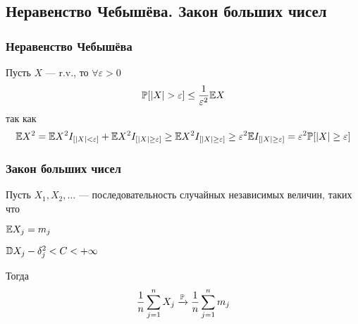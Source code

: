 \subsection{Неравенство Чебышёва. Закон больших
чисел}\label{ux43dux435ux440ux430ux432ux435ux43dux441ux442ux432ux43e-ux447ux435ux431ux44bux448ux451ux432ux430.-ux437ux430ux43aux43eux43d-ux431ux43eux43bux44cux448ux438ux445-ux447ux438ux441ux435ux43b}

\subsubsection{Неравенство
Чебышёва}\label{ux43dux435ux440ux430ux432ux435ux43dux441ux442ux432ux43e-ux447ux435ux431ux44bux448ux451ux432ux430}

Пусть \(X\) --- r.v., то \(\forall \varepsilon > 0\)
\[ \mathbb P [ |X| > \varepsilon ] \leq \frac{1}{\varepsilon^2} \mathbb E X \] так
как
\[ \mathbb E X^2 = \mathbb E X^2 I_{[|X|<\varepsilon]} + \mathbb E X^2 I_{[|X| \geq \varepsilon]} \geq 
   \mathbb E X^2 I_{[|X| \geq \varepsilon]} \geq
   \varepsilon^2 \mathbb E I_{[|X|\geq\varepsilon]} = \varepsilon^2 \mathbb P [|X|\geq\varepsilon] \]

\subsubsection{Закон больших
чисел}\label{ux437ux430ux43aux43eux43d-ux431ux43eux43bux44cux448ux438ux445-ux447ux438ux441ux435ux43b}

Пусть \(X_1, X_2, \ldots\) --- последовательность случайных независимых
величин, таких что

\(\mathbb E X_j = m_j\)

\(\mathbb D X_j - \delta_j^2 < C < +\infty\)

Тогда
\[\frac{1}{n} \sum_{j=1}^n X_j \xrightarrow{\mathbb P} \frac{1}{n}\sum_{j=1}^n m_j\]
